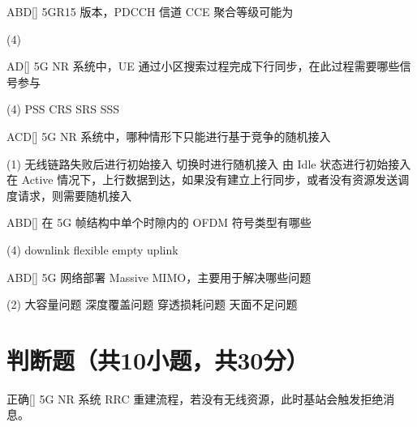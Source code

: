 \begin{choice}{\;ABD\;}[]
    5GR15 版本，PDCCH 信道 CCE 聚合等级可能为
    \begin{tasks}(4)
    \end{tasks}
\end{choice}

\begin{choice}{\;AD\;}[]
    5G NR 系统中，UE 通过小区搜索过程完成下行同步，在此过程需要哪些信号参与
    \begin{tasks}(4)
        \task PSS
        \task CRS
        \task SRS
        \task SSS
    \end{tasks}
\end{choice}

\begin{choice}{\;ACD\;}[]
    5G NR 系统中，哪种情形下只能进行基于竞争的随机接入
    \begin{tasks}(1)
        \task 无线链路失败后进行初始接入
        \task 切换时进行随机接入
        \task 由 Idle 状态进行初始接入
        \task 在 Active 情况下，上行数据到达，如果没有建立上行同步，或者没有资源发送调度请求，则需要随机接入
    \end{tasks}
\end{choice}

\begin{choice}{\;ABD\;}[]
    在 5G 帧结构中单个时隙内的 OFDM 符号类型有哪些
    \begin{tasks}(4)
        \task downlink
        \task flexible
        \task empty
        \task uplink
    \end{tasks}
\end{choice}

\begin{choice}{\;ABD\;}[]
    5G 网络部署 Massive MIMO，主要用于解决哪些问题
    \begin{tasks}(2)
        \task 大容量问题
        \task 深度覆盖问题
        \task 穿透损耗问题
        \task 天面不足问题
    \end{tasks}
\end{choice}



\section{判断题（共10小题，共30分）}

\begin{choice}{\;正确\;}[]
    5G NR 系统 RRC 重建流程，若没有无线资源，此时基站会触发拒绝消息。
\end{choice}


